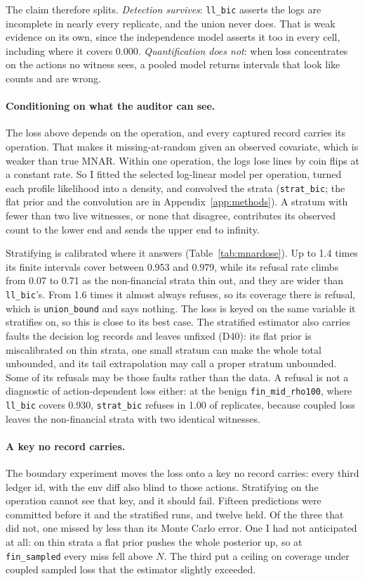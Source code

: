 \documentclass[11pt]{article}
\begin{document}
The claim therefore splits. \emph{Detection survives}: \texttt{ll\_bic} asserts
the logs are incomplete in nearly every replicate, and the union never does. That
is weak evidence on its own, since the independence model asserts it too in
every cell, including where it covers 0.000. \emph{Quantification does not}: when
loss concentrates on the actions no witness sees, a pooled model returns
intervals that look like counts and are wrong.

\paragraph{Conditioning on what the auditor can see.}
The loss above depends on the operation, and every captured record carries its
operation. That makes it missing-at-random given an observed covariate, which
is weaker than true MNAR. Within one operation, the logs lose lines by coin
flips at a constant rate. So I fitted the selected log-linear model per
operation, turned each profile likelihood into a density, and convolved the
strata (\texttt{strat\_bic}; the flat prior and the convolution are in
Appendix~\ref{app:methods}). A stratum with fewer than two live witnesses, or
none that disagree, contributes its observed count to the lower end and sends
the upper end to infinity.

Stratifying is calibrated where it answers (Table~\ref{tab:mnardose}). Up to
1.4 times its finite intervals cover between 0.953 and 0.979, while its refusal
rate climbs from 0.07 to 0.71 as the non-financial strata thin out, and they are
wider than \texttt{ll\_bic}'s. From 1.6 times it almost always refuses, so its
coverage there is refusal, which is \texttt{union\_bound} and says nothing. The
loss is keyed on the same variable it stratifies on, so this is close to its
best case. The stratified estimator also carries faults the decision log records
and leaves unfixed (D40): its flat prior is miscalibrated on thin strata, one
small stratum can make the whole total unbounded, and its tail extrapolation may
call a proper stratum unbounded. Some of its refusals may be those faults rather
than the data. A refusal is not a
diagnostic of action-dependent loss either: at the benign
\texttt{fin\_mid\_rho100}, where \texttt{ll\_bic} covers 0.930, \texttt{strat\_bic}
refuses in 1.00 of replicates, because coupled loss leaves the non-financial
strata with two identical witnesses.

\paragraph{A key no record carries.}
The boundary experiment moves the loss onto a key no record carries: every third
ledger id, with the env diff also blind to those actions. Stratifying on the
operation cannot see that key, and it should fail. Fifteen predictions were
committed before it and the stratified runs, and twelve held. Of the three that
did not, one missed by less than its Monte Carlo error. One I had not anticipated
at all: on thin strata a flat prior pushes the whole posterior up, so at
\texttt{fin\_sampled} every miss fell above $N$. The third put a ceiling on
coverage under coupled sampled loss that the estimator slightly exceeded.
\end{document}

